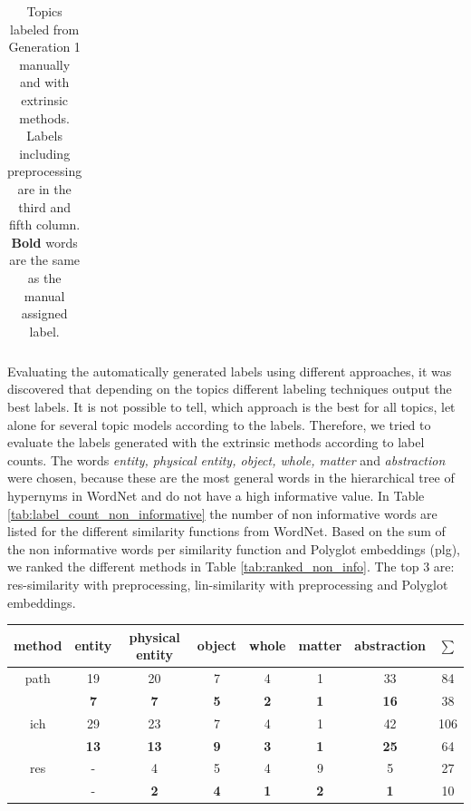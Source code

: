 {\begin{table}
\begin{minipage}[t]{0.5\textwidth}
\begin{tabular}{c|ll}
		\end{tabular}
	\end{minipage}
	\caption[Labeled topics with extrinsic methods and manually]{Topics labeled from Generation 1 manually and with extrinsic methods. Labels including preprocessing are in the third and fifth column. \textbf{Bold} words are the same as the manual assigned label.}
	\label{tab:labeled_extrinsic_and_manually}
\end{table}
Evaluating the automatically generated labels using different approaches, it was discovered that depending on the topics different labeling techniques output the best labels. It is not possible to tell, which approach is the best for all topics, let alone for several topic models according to the labels. Therefore, we tried to evaluate the labels generated with the extrinsic methods according to label counts. The words \textit{entity, physical entity, object, whole, matter} and \textit{abstraction} were chosen, because these are the most general words in the hierarchical tree of hypernyms in WordNet and do not have a high informative value. 
In Table \ref{tab:label_count_non_informative} the number of non informative words are listed for the different similarity functions from WordNet. Based on the sum of the non informative words per similarity function and Polyglot embeddings (plg), we ranked the different methods in Table \ref{tab:ranked_non_info}. The top 3 are: res-similarity with preprocessing, lin-similarity with preprocessing and Polyglot embeddings.
\begin{table}[h]
	\begin{tabular}{c|c|c|c|c|c|c|c}
		method & entity	& physical entity & object & whole & matter & abstraction & $\sum$ \\
		\hline
		path& 19		&20				  &7	   &4      &1       &33 &84\\
		& \textbf{7}&\textbf{7}	 &\textbf{5}  &\textbf{2} &\textbf{1} &\textbf{16} & 38\\
		\hline
		ich& 29		&23				  &7	   &4      &1       &42 & 106\\
		& \textbf{13}&\textbf{13}	 &\textbf{9}  &\textbf{3} &\textbf{1} &\textbf{25} & 64\\
		\hline
		res& -		&4				  &5	   &4      &9       &5 &27\\
		& -			&\textbf{2}	 &\textbf{4}  &\textbf{1} &\textbf{2} &\textbf{1} &10\\

\end{tabular}
\end{table}}
